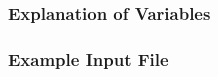 \vspace{5mm}
\subsubsection{Explanation of Variables}
\begin{description}

\end{description}

\vspace{5mm}
\subsubsection{Example Input File}


